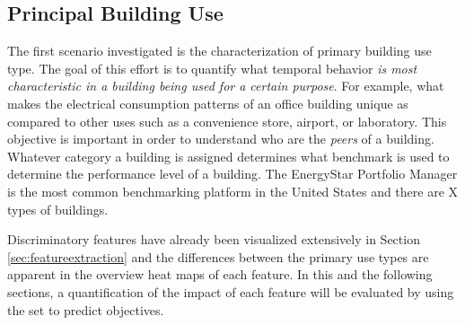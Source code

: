 \subsection{Principal Building Use}
\label{sec:buildinguse}

The first scenario investigated is the characterization of primary building use type. The goal of this effort is to quantify what temporal behavior \emph{is most characteristic in a building being used for a certain purpose}. For example, what makes the electrical consumption patterns of an office building unique as compared to other uses such as a convenience store, airport, or laboratory. This objective is important in order to understand who are the \emph{peers} of a building. Whatever category a building is assigned determines what benchmark is used to determine the performance level of a building. The EnergyStar Portfolio Manager is the most common benchmarking platform in the United States and there are X types of buildings.

Discriminatory features have already been visualized extensively in Section \ref{sec:featureextraction} and the differences between the primary use types are apparent in the overview heat maps of each feature. In this and the following sections, a quantification of the impact of each feature will be evaluated by using the set to predict objectives.